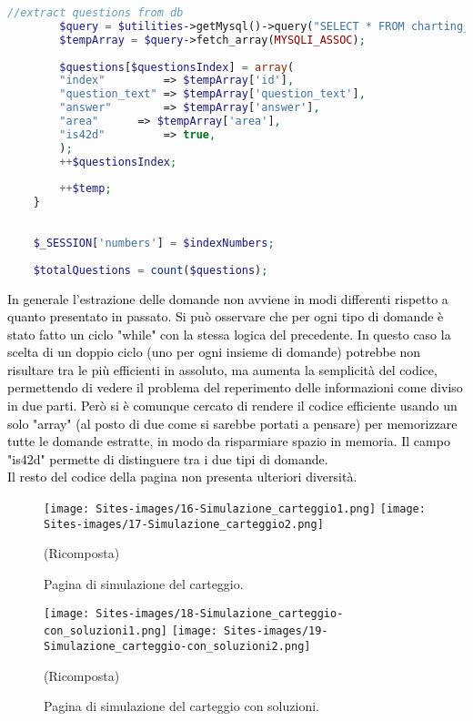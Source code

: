 \begin{lstlisting}[language=php]
		//extract questions from db
		$query = $utilities->getMysql()->query("SELECT * FROM charting_test_42d WHERE (id = '{$indexNumbers['42d'][$temp]}')");
		$tempArray = $query->fetch_array(MYSQLI_ASSOC);  
		
		$questions[$questionsIndex] = array(
		"index"         => $tempArray['id'],
		"question_text" => $tempArray['question_text'],
		"answer"        => $tempArray['answer'],
		"area"		=> $tempArray['area'],	
		"is42d"         => true,
		);
		++$questionsIndex;
		
		++$temp;
	}
	
	
	$_SESSION['numbers'] = $indexNumbers;
	
	$totalQuestions = count($questions);
\end{lstlisting}

\begin{minipage}{\textwidth}
	
	\vspace*{-12cm}
	
	\textcolor{black}{In generale l'estrazione delle domande non avviene in modi differenti rispetto a quanto presentato in passato. Si può osservare che per ogni tipo di domande è stato fatto un ciclo "while" con la stessa logica del precedente. In questo caso la scelta di un doppio ciclo (uno per ogni insieme di domande) potrebbe non risultare tra le più efficienti in assoluto, ma aumenta la semplicità del codice, permettendo di vedere il problema del reperimento delle informazioni come diviso in due parti. Però si è comunque cercato di rendere il codice efficiente usando un solo "array" (al posto di due come si sarebbe portati a pensare) per memorizzare tutte le domande estratte, in modo da risparmiare spazio in memoria. Il campo "is42d" permette di distinguere tra i due tipi di domande.\\
		Il resto del codice della pagina non presenta ulteriori diversità.}\\
\end{minipage}

\begin{minipage}{\textwidth}
	\begin{figure}[H]
		\begin{center}
			\texttt{[image: Sites-images/16-Simulazione\_carteggio1.png]}
			\texttt{[image: Sites-images/17-Simulazione\_carteggio2.png]}
			\caption{Pagina di simulazione del carteggio.}
			(Ricomposta)
		\end{center}
	\end{figure}
	
	\begin{figure}[H]
		\begin{center}
			\texttt{[image: Sites-images/18-Simulazione\_carteggio-con\_soluzioni1.png]}
			\texttt{[image: Sites-images/19-Simulazione\_carteggio-con\_soluzioni2.png]}
			\caption{Pagina di simulazione del carteggio con soluzioni.}
			(Ricomposta)
		\end{center}
	\end{figure}
\end{minipage}

